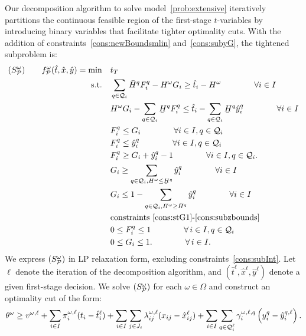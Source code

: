 \documentclass[11pt]{article}
\newcommand{\cQ}{{\cal Q}}
\newcommand{\cP}{{\cal P}}
\renewcommand{\underbar}{\underaccent{\bar}}
\begin{document}
	Our decomposition algorithm to solve model~\eqref{prob:extensive} iteratively partitions the continuous feasible region of the first-stage $t$-variables by introducing binary variables that facilitate tighter optimality cuts. With the addition of constraints~\eqref{cons:newBoundsmlin} and~\eqref{cons:subyG}, the tightened subproblem is: 
	\begin{subequations}
		\label{prob:subTightened}
		\begin{align}
		(S_{\cP}^\omega) \qquad f^\omega_{\cP}(\hat{t},\hat{x},\hat{y}) = \min \quad & t_T \\
		\text{s.t.} \quad & \sum_{q \in \cQ_i} \bar{H}^q F_i^q - H^\omega G_i \geq \hat{t}_i - H^\omega \qquad \qquad \forall i \in I \label{cons:sFG1t}\\
		& H^\omega G_i - \sum_{q \in \cQ_i} \underbar{H}^q F_i^q \leq \hat{t}_i - \sum_{q \in \cQ_i} \underbar{H}^q \hat{y}_i^q \qquad \qquad \forall i \in I \label{cons:sFG2t}\\
		& F_i^q \leq G_i \qquad \qquad \forall i \in I, q \in \cQ_i \label{cons:sFGlin1t}\\
		& F_i^q \leq \hat{y}_i^q \qquad \qquad \forall i \in I, q \in \cQ_i \label{cons:sFGlin2t}\\
		& F_i^q \geq G_i + \hat{y}_i^q - 1 \qquad \qquad \forall i \in I, q \in \cQ_i. \label{cons:sFGlin3t}\\
		& G_i \geq \sum_{q \in \cQ_i, H^\omega \leq \underbar{H}^q} \hat{y}_i^q \qquad \qquad \forall i \in I \label{cons:syG1t}\\
		& G_i \leq 1 - \sum_{q \in \cQ_i, H^\omega \geq \bar{H}^q} \hat{y}_i^q \qquad \qquad \forall i \in I \label{cons:syG2t}\\
		& \text{constraints~\eqref{cons:stG1}-\eqref{cons:subzbounds}} \\
		& 0 \leq F_i^q \leq 1 \qquad \qquad \forall \,i \in I, q \in \cQ_i\\
		& 0 \leq G_i \leq 1. \qquad \qquad \forall \,i \in I. \label{cons:G01t}
		\end{align}
	\end{subequations}
	We express $(S_{\cP}^\omega)$ in LP relaxation form, excluding constraints~\eqref{cons:subInt}. Let $\ell$ denote the iteration of the decomposition algorithm, and $(\hat{t}^\ell,\hat{x}^\ell,\hat{y}^\ell)$ denote a given first-stage decision. We solve \((S_{\cP}^\omega)\) for each \(\omega \in \Omega\) and construct an optimality cut of the form:
	\begin{equation} \label{cons:cut}
	\theta^\omega \geq v^{\omega,\ell} + \sum_{i \in I} \pi_i^{\omega,\ell} (t_i - \hat{t}_i^{\ell}) + \sum_{i \in I} \sum_{j \in J_i} \lambda_{ij}^{\omega,\ell} (x_{ij} - \hat{x}_{ij}^{\ell}) + \sum_{i \in I} \sum_{q \in \cQ^{\ell}_i} {\gamma_{i}^{\omega,\ell,q}} \left( y_i^{q} - \hat{y}_i^{q,\ell} \right).
	\end{equation}
\end{document}
